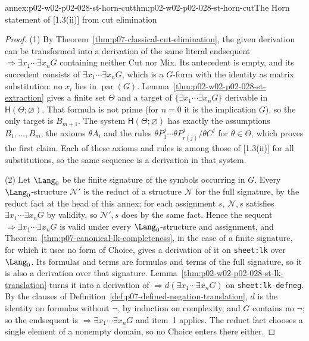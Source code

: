 \begin{annexitem}{annex:p02-w02-p02-028-st-horn-cut}{thm:p02-w02-p02-028-st-horn-cut}{The Horn statement of [1.3(ii)] from cut elimination}
\begin{proof}
(1) By Theorem~\ref{thm:p07-classical-cut-elimination}, the given derivation
can be transformed into a derivation of the same literal endsequent
\(\Rightarrow\exists x_1\cdots\exists x_nG\) containing neither Cut nor Mix.
Its antecedent is empty, and its succedent consists of
\(\exists x_1\cdots\exists x_nG\), which is a \(G\)-form with the identity as
matrix substitution: no \(x_i\) lies in \(\operatorname{par}(G)\).
Lemma~\ref{thm:p02-w02-p02-028-st-extraction} gives a finite set
\(\Theta\) and a target of \(\{\exists x_1\cdots\exists x_nG\}\) derivable in
\(\mathsf H(\Theta;\varnothing)\).  That formula is not prime (for \(n=0\) it
is the implication \(G\)), so the only target is \(B_{m+1}\).  The system
\(\mathsf H(\Theta;\varnothing)\) has exactly the assumptions
\(B_1,\ldots,B_m\), the axioms \(\theta A_i\) and the rules
\(\theta P^j_1\cdots\theta P^j_{r(j)}/\theta C^j\) for \(\theta\in\Theta\),
which proves the first claim.  Each of these axioms and rules is among those
of [1.3(ii)] for all substitutions, so the same sequence is a derivation in
that system.

(2) Let \(\Lang_0\) be the finite signature of the symbols occurring in
\(G\).  Every \(\Lang_0\)-structure \(\mathcal N'\) is the reduct of a
structure \(\mathcal N\) for the full signature, by the reduct fact at the
head of this annex; for each assignment \(s\), \(\mathcal N,s\) satisfies
\(\exists x_1\cdots\exists x_nG\) by validity, so \(\mathcal N',s\) does by
the same fact.  Hence the sequent \(\Rightarrow\exists x_1\cdots\exists x_nG\)
is valid under every \(\Lang_0\)-structure and assignment, and
Theorem~\ref{thm:p07-canonical-lk-completeness}, in the case of a finite
signature, for which it uses no form of Choice, gives a derivation of it on
\texttt{sheet:lk} over \(\Lang_0\).  Its formulas and terms are formulas and
terms of the full signature, so it is also a derivation over that signature.
Lemma~\ref{thm:p02-w02-p02-028-st-lk-translation} turns it into a derivation
of \(\Rightarrow d(\exists x_1\cdots\exists x_nG)\) on
\texttt{sheet:lk-defneg}.  By the clauses of
Definition~\ref{def:p07-defined-negation-translation}, \(d\) is the identity
on formulas without \(\neg\), by induction on complexity, and \(G\) contains
no \(\neg\); so the endsequent is \(\Rightarrow\exists x_1\cdots\exists x_nG\)
and item~1 applies.  The reduct fact chooses a single element of a nonempty
domain, so no Choice enters there either.
\end{proof}
\end{annexitem}

